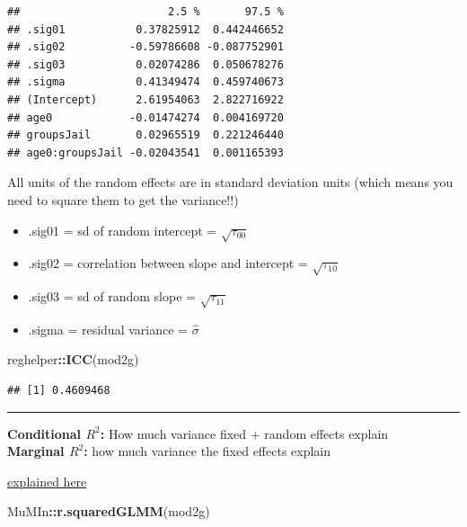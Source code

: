 \documentclass[]{article}
\newenvironment{Shaded}{\begin{snugshade}}{\end{snugshade}}
\newcommand{\KeywordTok}[1]{\textcolor[rgb]{0.13,0.29,0.53}{\textbf{#1}}}
\newcommand{\OperatorTok}[1]{\textcolor[rgb]{0.81,0.36,0.00}{\textbf{#1}}}
\newcommand{\NormalTok}[1]{#1}
\begin{document}
\begin{verbatim}
##                       2.5 %       97.5 %
## .sig01           0.37825912  0.442446652
## .sig02          -0.59786608 -0.087752901
## .sig03           0.02074286  0.050678276
## .sigma           0.41349474  0.459740673
## (Intercept)      2.61954063  2.822716922
## age0            -0.01474274  0.004169720
## groupsJail       0.02965519  0.221246440
## age0:groupsJail -0.02043541  0.001165393
\end{verbatim}

All units of the random effects are in standard deviation units (which
means you need to square them to get the variance!!)\\

\begin{itemize}
  \item .sig01 = sd of random intercept = $\sqrt{\tau_{00}}$  
  \item .sig02 = correlation between slope and intercept = $\sqrt{\tau_{10}}$  
  \item .sig03 = sd of random slope = $\sqrt{\tau_{11}}$  
  \item .sigma = residual variance = $\hat{\sigma}$  
\end{itemize}

\small

\begin{Shaded}
\begin{Highlighting}[]
\NormalTok{reghelper}\OperatorTok{::}\KeywordTok{ICC}\NormalTok{(mod2g)}
\end{Highlighting}
\end{Shaded}

\begin{verbatim}
## [1] 0.4609468
\end{verbatim}

\begin{center}\rule{0.5\linewidth}{\linethickness}\end{center}

\small
\textbf{Conditional $R^2$:} How much variance fixed + random effects
explain\\
\textbf{Marginal $R^2$:} how much variance the fixed effects explain

\href{https://jonlefcheck.net/2013/03/13/r2-for-linear-mixed-effects-models/}{explained
here}

\begin{Shaded}
\begin{Highlighting}[]
\NormalTok{MuMIn}\OperatorTok{::}\KeywordTok{r.squaredGLMM}\NormalTok{(mod2g)}
\end{Highlighting}
\end{Shaded}
\end{document}
